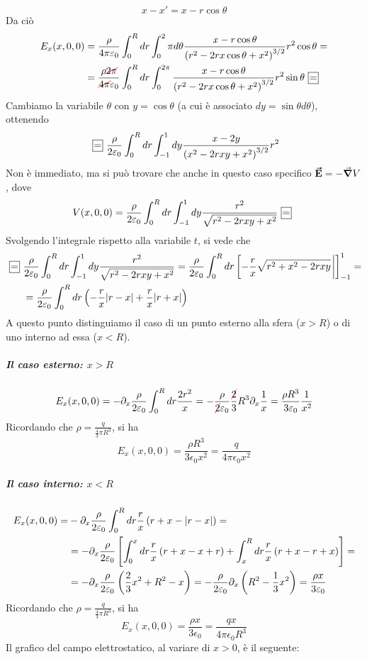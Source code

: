 \begin{equation*}
	x-x'=x-r\cos\theta
\end{equation*}
Da ciò 
\begin{align*}
	E_x(x,0,0)&=\frac{\rho}{4\pi\epsilon_0}\int_0^Rdr\int_0^2\pi d\theta \frac{x-r\cos\theta}{\left(r^2-2rx\cos\theta+x^2\right)^{3/2}}r^2\cos\theta=\\
	&=\frac{\rho \Ccancel[red]{2\pi}}{\Ccancel[red]{4\pi}\epsilon_0}\int_0^Rdr\int_{0}^{2\pi}\frac{x-r\cos\theta}{\left(r^2-2rx\cos\theta+x^2\right)^{3/2}}r^2\sin\theta\squarequal
\end{align*}
Cambiamo la variabile $\theta$ con $y=\cos\theta$ (a cui è associato $dy=\sin\theta d\theta$), ottenendo
\begin{equation*}
	\squarequal\frac{\rho}{2\epsilon_0}\int_0^Rdr\int_{-1}^{1}dy\frac{x-2y}{\left(x^2-2rxy+x^2\right)^{3/2}}r^2
\end{equation*}
Non è immediato, ma si può trovare che anche in questo caso specifico $\vb*{\va{E}}=-\grad{V}$, dove
\begin{equation*}
	V(x,0,0)=\frac{\rho}{2\epsilon_0}\int_{0}^Rdr\int_{-1}^{1}dy\frac{r^2}{\sqrt{r^2-2rxy+x^2}}\squarequal
\end{equation*}
Svolgendo l'integrale rispetto alla variabile $t$, si vede che
\begin{align*}
	\squarequal&\frac{\rho}{2\epsilon_0}\int_{0}^Rdr\int_{-1}^{1}dy\frac{r^2}{\sqrt{r^2-2rxy+x^2}}=\frac{\rho}{2\epsilon_0}\int_{0}^Rdr\left[-\frac{r}{x}\sqrt{r^2+x^2-2rxy}\eval\right]_{-1}^{1}=\\
	&=\frac{\rho}{2\epsilon_0}\int_{0}^Rdr\left(-\frac{r}{x}\abs{r-x}+\frac{r}{x}\abs{r+x}\right)
\end{align*}
A questo punto distinguiamo il caso di un punto esterno alla sfera ($x>R$) o di uno interno ad essa ($x<R$).
\subparagraph{Il caso esterno: $x>R$}
\begin{equation*}
	E_x(x,0,0)=-\partial_x\frac{\rho}{2\epsilon_0}\int_0^Rdr\frac{2r^2}{x}=-\frac{\rho}{\Ccancel[red]{2}\epsilon_0}\frac{\Ccancel[red]{2}}{3}R^3\partial_x \frac{1}{x}=\frac{\rho R^3}{3\epsilon_0}\frac{1}{x^2}
\end{equation*}
Ricordando che $\rho=\frac{q}{\frac{4}{3}\pi R^3}$, si ha
\begin{equation}
	E_x(x,0,0)=\frac{\rho R^3}{3\epsilon_0x^2}=\frac{q}{4\pi\epsilon_0x^2}
\end{equation}
\subparagraph{Il caso interno: $x<R$}
\begin{align*}
 E_x(x,0,0)=&-\partial_x\frac{\rho}{2\varepsilon_0}\int_0^Rdr\frac{r}{x}\left(r+x-\abs{r-x}\right)=\\
 &=-\partial_x\frac{\rho}{2\varepsilon_0}\left[\int_0^xdr\frac{r}{x}\left(r+x-x+r\right)+\int_x^Rdr\frac{r}{x}\left(r+x-r+x\right)\right]=\\
 &=-\partial_x\frac{\rho}{2\varepsilon_0}\left(\frac{2}{3}x^2+R^2-x\right)=-\frac{\rho}{2\varepsilon_0}\partial_x\left(R^2-\frac{1}{3}x^2\right)=\frac{\rho x}{3\varepsilon_0}
\end{align*}
Ricordando che $\rho=\frac{q}{\frac{4}{3}\pi R^3}$, si ha
\begin{equation}
	E_x(x,0,0)=\frac{\rho x}{3\epsilon_0}=\frac{qx}{4\pi\epsilon_0R^3}
\end{equation}
Il grafico del campo elettrostatico, al variare di $x>0$, è il seguente: